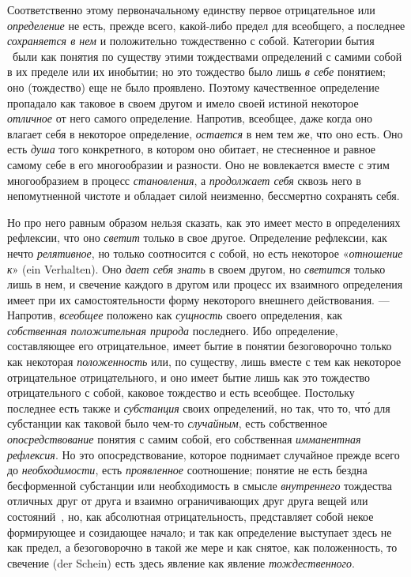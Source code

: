 \documentclass[twoside]{article}
\begin{document}
{{Соответственно этому первоначальному единству первое
отрицательное или {\em определение}
не есть, прежде всего, какой-либо предел для всеобщего, а
последнее {\em сохраняется в нем}
и положительно тождественно с собой. Категории бытия
\ были как понятия по существу этими тождествами определений
с самими собой в их пределе или их инобытии; но это тождество было лишь
{\em в себе} понятием;
оно (тождество) еще не было проявлено. Поэтому качественное определение
пропадало как таковое в своем другом и имело своей истиной некоторое
{\em отличное} от него
самого определение. Напротив, всеобщее, даже когда оно влагает себя в
некоторое определение, {\em остается}
в нем тем же, что оно есть. Оно есть
{\em душа} того
конкретного, в котором оно обитает, не стесненное и равное самому себе в
его многообразии и разности. Оно не вовлекается вместе с этим многообразием
в процесс {\em становления},
а {\em продолжает себя}
сквозь него в непомутненной чистоте и обладает силой
неизменно, бессмертно сохранять себя.

Но про него равным образом нельзя сказать, как это имеет место
в определениях рефлексии, что оно
{\em светит} только в
свое другое. Определение рефлексии, как нечто
{\em релятивное}, но
только соотносится с собой, но есть некоторое
«{\em отношение к}» (ein Verhalten).
Оно {\em дает себя знать}
в своем другом, но
{\em светится} только
лишь в нем, и свечение каждого в другом или процесс их взаимного
определения имеет при их самостоятельности форму некоторого внешнего
действования. — Напротив,
{\em всеобщее} положено
как {\em сущность} своего
определения, как {\em собственная
положительная природа} последнего. Ибо определение,
составляющее его отрицательное, имеет бытие в понятии безоговорочно только
как некоторая {\em положенность}
или, по существу, лишь вместе с тем как некоторое
отрицательное отрицательного, и оно имеет бытие лишь как это тождество
отрицательного с собой, каковое тождество и есть всеобщее. Постольку
последнее есть также и {\em субстанция}
своих определений, но так, что то, что́ для субстанции как
таковой было чем-то {\em случайным},
есть собственное
{\em опосредствование}
понятия с самим собой, его собственная
{\em имманентная рефлексия}.
Но это опосредствование, которое поднимает случайное прежде
всего до {\em необходимости},
есть {\em проявленное}
соотношение; понятие не есть бездна бесформенной субстанции
или необходимость в смысле
{\em внутреннего}
тождества отличных друг от друга и взаимно ограничивающих
друг друга вещей или
состояний~\label{bkm:bm15},
но, как абсолютная отрицательность, представляет собой некое
формирующее и созидающее начало; и так как определение выступает здесь не
как предел, а безоговорочно в такой же мере и как снятое, как положенность,
то свечение (der Schein) есть здесь явление как явление
{\em тождественного}.

}}
\end{document}
